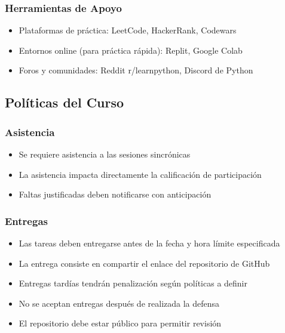 \documentclass[12pt,letterpaper]{article}
\begin{document}
\subsubsection{Herramientas de Apoyo}
\begin{itemize}[leftmargin=*]
    \item Plataformas de práctica: LeetCode, HackerRank, Codewars
    \item Entornos online (para práctica rápida): Replit, Google Colab
    \item Foros y comunidades: Reddit r/learnpython, Discord de Python
\end{itemize}

\subsection{Políticas del Curso}

\subsubsection{Asistencia}
\begin{itemize}[leftmargin=*]
    \item Se requiere asistencia a las sesiones sincrónicas
    \item La asistencia impacta directamente la calificación de participación
    \item Faltas justificadas deben notificarse con anticipación
\end{itemize}

\subsubsection{Entregas}
\begin{itemize}[leftmargin=*]
    \item Las tareas deben entregarse antes de la fecha y hora límite especificada
    \item La entrega consiste en compartir el enlace del repositorio de GitHub
    \item Entregas tardías tendrán penalización según políticas a definir
    \item No se aceptan entregas después de realizada la defensa
    \item El repositorio debe estar público para permitir revisión
\end{itemize}
\end{document}

